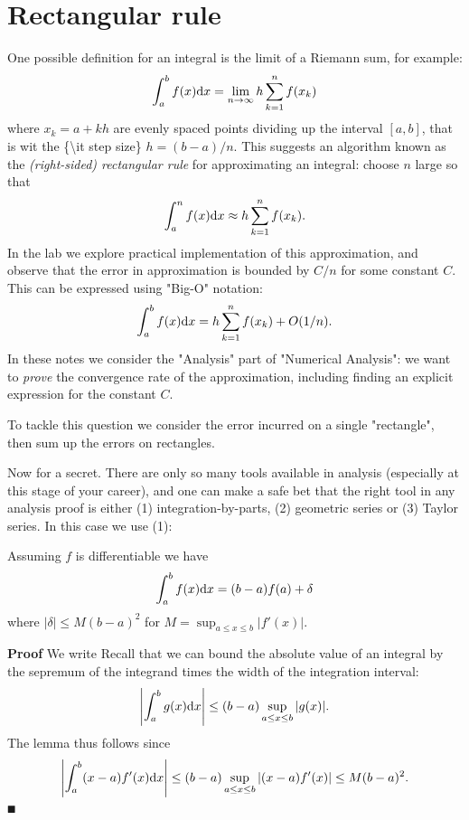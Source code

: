 
\section{Rectangular rule}
One possible definition for an integral is the limit of a Riemann sum, for example:
\[
  \ensuremath{\int}_a^b f(x) {\rm d}x = \lim_{n \ensuremath{\rightarrow} \ensuremath{\infty}} h \ensuremath{\sum}_{k=1}^n f(x_k)
\]
where $x_k = a+kh$ are evenly spaced points dividing up the interval $[a,b]$, that is  wit the \{{\textbackslash}it step size\} $h = (b-a)/n$. This suggests an algorithm known as the \emph{(right-sided) rectangular rule} for approximating an integral: choose $n$ large so that
\[
  \ensuremath{\int}_a^n f(x) {\rm d}x \ensuremath{\approx} h \ensuremath{\sum}_{k=1}^n f(x_k).
\]
In the lab we explore practical implementation of this approximation, and observe that the error in approximation is bounded by $C/n$ for some constant $C$. This can be expressed using "Big-O" notation:
\[
\ensuremath{\int}_a^b f(x) {\rm d}x = h \ensuremath{\sum}_{k=1}^n f(x_k) + O(1/n).
\]
In these notes we consider the "Analysis" part of "Numerical Analysis": we want to \emph{prove} the convergence rate of the approximation, including finding an explicit expression for the constant $C$.

To tackle this question we consider the error incurred on a single "rectangle", then sum up the errors on rectangles.

Now for a secret. There are only so many tools available in analysis (especially at this stage of your career), and  one can make a safe bet that the right tool in any analysis proof is either (1) integration-by-parts, (2) geometric series or (3) Taylor series. In this case we use (1):

\begin{lemma} Assuming $f$ is differentiable we have
\[
\ensuremath{\int}_a^b f(x) {\rm d}x = (b-a) f(a) +  \ensuremath{\delta}
\]
where $|\ensuremath{\delta}| \ensuremath{\leq} M (b-a)^2$ for $M = \sup_{a \ensuremath{\leq} x \ensuremath{\leq} b}|f'(x)|$.

\end{lemma}
\textbf{Proof} We write
Recall that we can bound the absolute value of an integral by the sepremum of the integrand times the width of the integration interval:
\[
\left|{\int_a^b g(x) {\rm d} x}\right| \leq (b-a) \sup_{a \leq x \leq b}|g(x)|.
\]
The lemma thus follows since
\[
\left|{\int_a^b (x-a) f'(x) {\rm d} x}\right| \leq (b-a) \sup_{a \leq x \leq b}|(x-a) f'(x)| \leq M (b-a)^2.
\]
\ensuremath{\QED}

